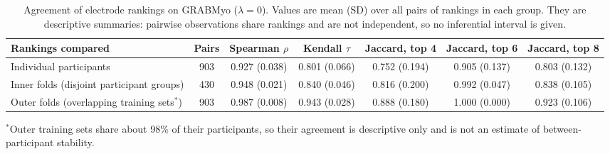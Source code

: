 \begin{table}[htbp]
\centering
\small
\caption{Agreement of electrode rankings on GRABMyo ($\lambda = 0$). Values are mean (SD) over all pairs of rankings in each group. They are descriptive summaries: pairwise observations share rankings and are not independent, so no inferential interval is given.}
\label{tab:stability}
\setlength{\tabcolsep}{4pt}
\begin{adjustbox}{max width=\textwidth}
\begin{tabular}{lcccccc}
\toprule
Rankings compared & Pairs & Spearman $\rho$ & Kendall $\tau$ & Jaccard, top 4 & Jaccard, top 6 & Jaccard, top 8 \\
\midrule
Individual participants & 903 & 0.927 (0.038) & 0.801 (0.066) & 0.752 (0.194) & 0.905 (0.137) & 0.803 (0.132) \\
Inner folds (disjoint participant groups) & 430 & 0.948 (0.021) & 0.840 (0.046) & 0.816 (0.200) & 0.992 (0.047) & 0.838 (0.105) \\
Outer folds (overlapping training sets$^*$) & 903 & 0.987 (0.008) & 0.943 (0.028) & 0.888 (0.180) & 1.000 (0.000) & 0.923 (0.106) \\
\bottomrule
\end{tabular}
\end{adjustbox}
\par\smallskip\parbox{0.95\linewidth}{\footnotesize $^*$Outer training sets share about 98\% of their participants, so their agreement is descriptive only and is not an estimate of between-participant stability.}
\end{table}
